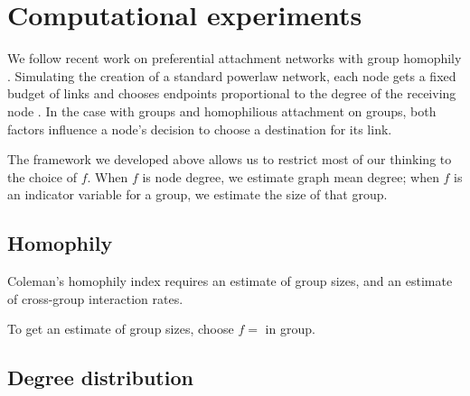 \documentclass[a4paper]{article}
\begin{document}
\begin{comment}
\begin{align}
P(f(X_i) = k) &= \pi(f(X_i) = k) \frac{\bar{d}}{d_i}\\
&= \frac{\sum_{V_k} d_j}{D} \frac{\bar{d}}{d_i}\\
&= \frac{\sum_{V_k} d_j}{D} \frac{D}{N d_i}\\
&= \frac{|V_k|}{N}\\
&= P(f(V) = k).
\end{align}

This argument indicates that weighting draws from the random walk by $\frac{\bar{d}}{d_i}$ faithfully replicates the distribution of $f(X_i)$. In practice, we estimate the mean degree from a walk, potentially the same one we bootstrap from. This introduces error according to the sampling variance of estimating the mean.

\end{comment}

\section{Computational experiments}

We follow recent work on preferential attachment networks with group homophily \cite{}. Simulating the creation of a standard powerlaw network, each node gets a fixed budget of links and chooses endpoints proportional to the degree of the receiving node \cite{}. In the case with groups and homophilious attachment on groups, both factors influence a node's decision to choose a destination for its link.

The framework we developed above allows us to restrict most of our thinking to the choice of $f$. When $f$ is node degree, we estimate graph mean degree; when $f$ is an indicator variable for a group, we estimate the size of that group.

\subsection{Homophily}

Coleman's homophily index requires an estimate of group sizes, and an estimate of cross-group interaction rates.

To get an estimate of group sizes, choose $f = $ in group.

\subsection{Degree distribution}
\end{document}
